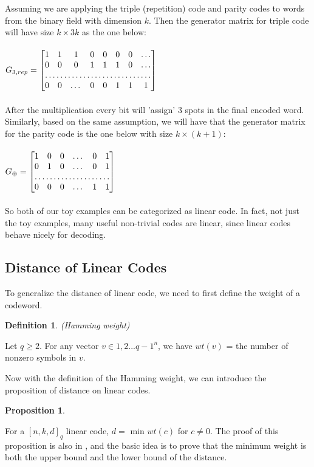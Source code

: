 \documentclass{article}
\newtheorem{Definition}{Definition}
\newtheorem{Proposition}{Proposition}
\begin{document}
Assuming we are applying the triple (repetition) code and parity codes to words from the binary field with dimension $k$. Then the generator matrix for triple code will have size $k \times 3k$ as the one below:\\\\
$G_{3,rep} = \begin{bmatrix}
    1 & 1 & 1 & 0 & 0 & 0 & 0 & \dots\\
    0 & 0 & 0 & 1 & 1 & 1 & 0 & \dots \\
    \hdotsfor{8} \\
    0 & 0 & \dots & 0 & 0 & 1 & 1 & 1 \\
\end{bmatrix}$\\\\ 
After the multiplication every bit will 'assign' 3 spots in the final encoded word. Similarly, based on the same assumption, we will have that the generator matrix for the parity code is the one below with size $k \times (k+1) $:\\\\
$G_\oplus = \begin{bmatrix}
    1 & 0& 0 & \dots & 0 & 1\\
    0 & 1& 0 & \dots & 0 & 1 \\
    \hdotsfor{6} \\
    0 & 0& 0 & \dots & 1 & 1 \\
\end{bmatrix}$\\\\
So both of our toy examples can be categorized as linear code. In fact, not just the toy examples, many useful non-trivial codes are linear, since linear codes behave nicely for decoding.
\subsection{Distance of Linear Codes}
To generalize the distance of linear code, we need to first define the weight of a codeword.
\begin{Definition}(Hamming weight)\end{Definition}
\noindent Let $q \ge 2$. For any vector $v \in {1,2...q-1}^n$, we have $wt(v)$ = the number of nonzero symbols in $v$.

Now with the definition of the Hamming weight, we can introduce the proposition of distance on linear codes.
\begin{Proposition} \end{Proposition}
\noindent For a $[n,k,d]_q$ linear code, $d =$ min $wt(c)$ for $c \neq 0$. The proof of this proposition is also in \cite{book}, and the basic idea is to prove that the minimum weight is both the upper bound and the lower bound of the distance.
\end{document}
